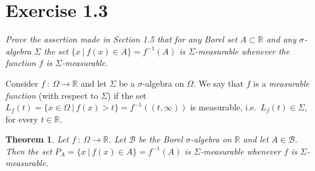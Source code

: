 \documentclass[12pt]{article}
\theoremstyle{plain}
\newtheorem{theorem}{Theorem}
\newenvironment{definition}[1][Definition]{\begin{trivlist}
\item[\hskip \labelsep {\bfseries #1}]}{\end{trivlist}}
\begin{document}
\section*{Exercise 1.3}
\textit{Prove the assertion made in Section 1.5 that for any Borel set $A \subset \mathbb{R}$ and any $\sigma$-algebra $\Sigma$ the set $\{x\ |\ f(x) \in A\} = f^{-1}(A)$ is $\Sigma$-measurable whenever the function $f$ is $\Sigma$-measurable.}

\begin{definition}
    Consider $f\ :\ \Omega \rightarrow \mathbb{R}$ and let $\Sigma$ be a $\sigma$-algebra on $\Omega$.  We say that $f$ is a \emph{measurable function} (with respect to $\Sigma$) if the set $L_f(t) = \{x \in \Omega\ |\ f(x) > t\} = f^{-1}((t, \infty))$ is measurable, i.e.~$L_f(t) \in \Sigma$, for every $t \in \mathbb{R}$.
\end{definition}
\begin{theorem}
    Let $f\ :\ \Omega \rightarrow \mathbb{R}$.  Let $\mathcal{B}$ be the Borel $\sigma$-algebra on $\mathbb{R}$ and let $A \in \mathcal{B}$.  Then the set $P_A = \{x\ |\ f(x) \in A\} = f^{-1}(A)$ is $\Sigma$-measurable whenever $f$ is $\Sigma$-measurable.
\end{theorem}
\end{document}
